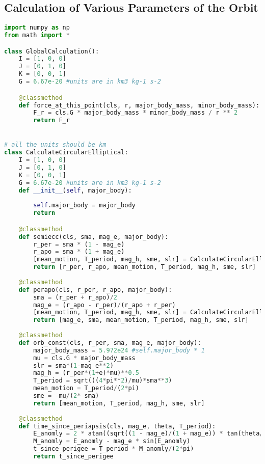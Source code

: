 \subsection{Calculation of Various Parameters of the Orbit}
\begin{lstlisting}[language=python, caption=VPCO]
import numpy as np
from math import *

class GlobalCalculation():
    I = [1, 0, 0]
    J = [0, 1, 0]
    K = [0, 0, 1]
    G = 6.67e-20 #units are in km3 kg-1 s-2

    @classmethod
    def force_at_this_point(cls, r, major_body_mass, minor_body_mass):
        F_r = cls.G * major_body_mass * minor_body_mass / r ** 2
        return F_r


# all the units should be km
class CalculateCircularElliptical:
    I = [1, 0, 0]
    J = [0, 1, 0]
    K = [0, 0, 1]
    G = 6.67e-20 #units are in km3 kg-1 s-2
    def __init__(self, major_body):
    
        self.major_body = major_body
        return

    @classmethod
    def semiecc(cls, sma, mag_e, major_body):
        r_per = sma * (1 - mag_e)
        r_apo = sma * (1 + mag_e)
        [mean_motion, T_period, mag_h, sme, slr] = CalculateCircularElliptical.orb_const(r_per, sma, mag_e, major_body)
        return [r_per, r_apo, mean_motion, T_period, mag_h, sme, slr]
    
    @classmethod
    def perapo(cls, r_per, r_apo, major_body):
        sma = (r_per + r_apo)/2
        mag_e = (r_apo - r_per)/(r_apo + r_per)
        [mean_motion, T_period, mag_h, sme, slr] = CalculateCircularElliptical.orb_const(r_per, sma, mag_e, major_body)
        return [mag_e, sma, mean_motion, T_period, mag_h, sme, slr]
    
    @classmethod
    def orb_const(cls, r_per, sma, mag_e, major_body):
        major_body_mass = 5.972e24 #self.major_body * 1
        mu = cls.G * major_body_mass
        slr = sma*(1-mag_e**2)
        mag_h = (r_per*(1+e)*mu)**0.5
        T_period = sqrt(((4*pi**2)/mu)*sma**3)
        mean_motion = T_period/(2*pi)
        sme = -mu/(2* sma)
        return [mean_motion, T_period, mag_h, sme, slr]
    
    @classmethod
    def time_since_periapsis(cls, mag_e, theta, T_period):
        E_anomly = 2 * atan((sqrt((1 - mag_e)/(1 + mag_e)) * tan(theta/2)))
        M_anomly = E_anomly - mag_e * sin(E_anomly)
        t_since_perigee = T_period * M_anomly/(2*pi)
        return t_since_perigee
    

\end{lstlisting}
